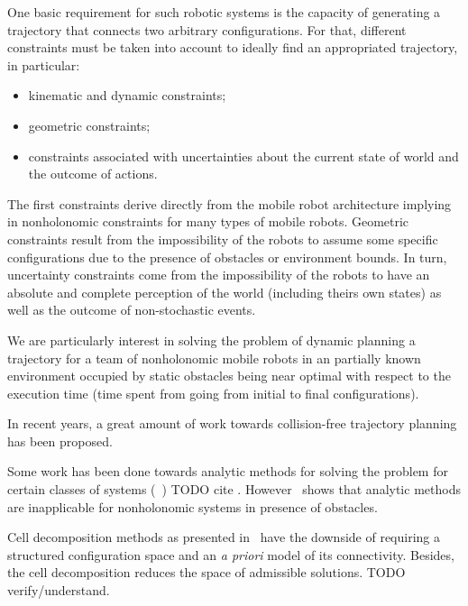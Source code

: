 \documentclass[eprint]{actapoly}
\begin{document}

One basic requirement for such robotic systems is the capacity of generating a 
trajectory that connects two arbitrary configurations. For that, different 
constraints must be taken into account to ideally find an appropriated 
trajectory, in particular:

\begin{itemize}

 \item kinematic and dynamic constraints;

 \item geometric constraints;

 \item constraints associated with uncertainties about the current state of 
world and the outcome of actions.

\end{itemize}

The first constraints derive directly from the mobile robot architecture 
implying in nonholonomic constraints for many types of mobile robots. Geometric 
constraints result from the impossibility of the robots to assume some specific 
configurations due to the presence of obstacles or environment bounds. In turn, 
uncertainty constraints come from the impossibility of the robots to have an 
absolute and complete perception of the world (including theirs own states) as 
well as the outcome of non-stochastic events.

 

We are particularly interest in solving the problem of dynamic planning a 
trajectory for a team of nonholonomic mobile robots in an partially known 
environment occupied by static obstacles being near optimal with respect to the 
execution time (time spent from going from initial to final configurations).

 


In recent years, a great amount of work towards collision-free trajectory 
planning has been proposed.

 

Some work has been done towards analytic methods for solving the problem for 
certain classes of systems (~\cite{})
TODO cite
. However~\cite{Schwartz1988} shows 
that analytic methods  are inapplicable for nonholonomic systems in presence of 
obstacles.

 

Cell decomposition methods as presented in~\cite{Latombe1991} have the 
downside of requiring a structured configuration space and an \textit{a priori} 
model of its connectivity. Besides, the cell decomposition reduces the space 
of admissible solutions. TODO verify/understand.
\end{document}
